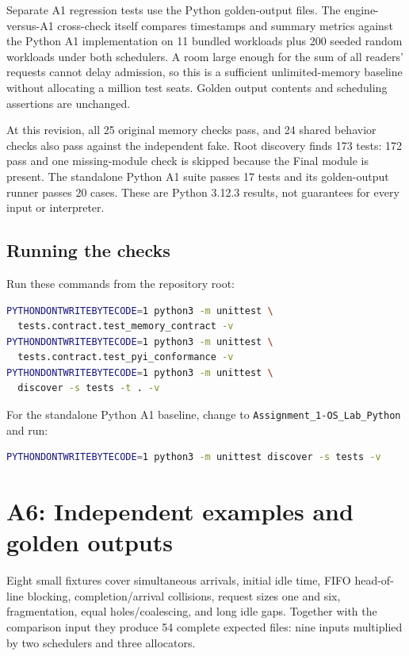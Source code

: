 \documentclass[11pt,a4paper]{article}
\begin{document}
Separate A1 regression tests use the Python golden-output files. The
engine-versus-A1 cross-check itself compares timestamps and summary metrics
against the Python A1 implementation on 11 bundled workloads plus 200 seeded
random workloads under
both schedulers. A room large enough for the sum of all readers' requests
cannot delay admission, so this is a sufficient unlimited-memory baseline
without allocating a million test seats. Golden output contents and scheduling
assertions are unchanged.

At this revision, all 25 original memory checks pass, and 24 shared behavior
checks also pass against the independent fake. Root discovery finds 173 tests:
172 pass and one missing-module check is skipped because the Final module
is present. The standalone Python A1 suite passes 17 tests and its golden-output
runner passes 20 cases. These are Python 3.12.3 results, not guarantees for
every input or interpreter.

\subsection{Running the checks}
Run these commands from the repository root:
\begin{lstlisting}[language=bash]
PYTHONDONTWRITEBYTECODE=1 python3 -m unittest \
  tests.contract.test_memory_contract -v
PYTHONDONTWRITEBYTECODE=1 python3 -m unittest \
  tests.contract.test_pyi_conformance -v
PYTHONDONTWRITEBYTECODE=1 python3 -m unittest \
  discover -s tests -t . -v
\end{lstlisting}
For the standalone Python A1 baseline, change to
\texttt{Assignment\_1-OS\_Lab\_Python} and run:
\begin{lstlisting}[language=bash]
PYTHONDONTWRITEBYTECODE=1 python3 -m unittest discover -s tests -v
\end{lstlisting}


\section{A6: Independent examples and golden outputs}

Eight small fixtures cover simultaneous arrivals, initial idle time, FIFO
head-of-line blocking, completion/arrival collisions, request sizes one and
six, fragmentation, equal holes/coalescing, and long idle gaps. Together with
the comparison input they produce 54 complete expected files: nine inputs
multiplied by two schedulers and three allocators.
\end{document}
